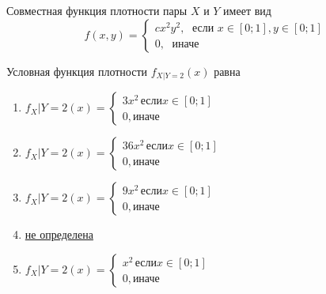 \documentclass[t]{beamer}
\begin{document}
 \begin{frame} \label{22} 
\begin{block}{22} 

Совместная функция плотности пары $X$ и $Y$ имеет вид
\[
f(x,y)=\begin{cases}
cx^2y^2, \; \text{ если } x\in[0;1], y\in [0;1] \\
0, \; \text{ иначе}
\end{cases}
\]
 
Условная функция плотности  $f_{X|Y=2}(x)$ равна

 \end{block} 

\begin{enumerate} 
\item[] \hyperlink{22-No}{\beamergotobutton{} $f_X|Y=2(x)=\begin{cases} 3x^2\, \text{если}  x\in [0;1] \\ 0, \text{иначе}     \end{cases}$}
\item[] \hyperlink{22-No}{\beamergotobutton{} $f_X|Y=2(x)=\begin{cases} 36x^2\, \text{если}  x\in [0;1] \\ 0, \text{иначе}     \end{cases}$}
\item[] \hyperlink{22-No}{\beamergotobutton{} $f_X|Y=2(x)=\begin{cases} 9x^2\, \text{если}  x\in [0;1] \\ 0, \text{иначе}     \end{cases}$}
\item[] \hyperlink{22-Yes}{\beamergotobutton{} не определена}
\item[] \hyperlink{22-No}{\beamergotobutton{} $f_X|Y=2(x)=\begin{cases} x^2\, \text{если}  x\in [0;1] \\ 0, \text{иначе}     \end{cases}$}
\end{enumerate} 
\end{frame} 
\end{document}
